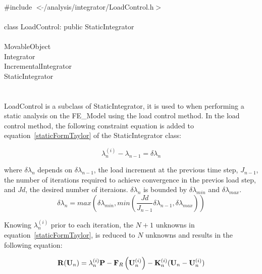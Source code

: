 
   \\
\indent \#include $<\tilde{ }$/analysis/integrator/LoadControl.h$>$  \\

  \\
\indent class LoadControl: public StaticIntegrator  \\

 \\
\indent MovableObject \\
\indent\indent Integrator \\
\indent\indent\indent IncrementalIntegrator \\
\indent\indent\indent\indent StaticIntegrator \\
\indent\indent\indent\indent{} \\

 \\ 
\indent LoadControl is a subclass of StaticIntegrator, it is
used to when performing a static analysis on the FE\_Model using the
load control method. In the load control method, the following
constraint equation is added to equation~\ref{staticFormTaylor} of the
StaticIntegrator class: 

\[ 
\lambda_n^{(i)} - \lambda_{n-1} = \delta \lambda_n
\]

\noindent where $\delta \lambda_n$ depends on $\delta \lambda_{n-1}$,
the load increment at the previous time step, $J_{n-1}$,
the number of iterations required to achieve convergence in the
previos load step, and $Jd$, the desired number of iteraions. $\delta
\lambda_n$ is bounded by $\delta \lambda_{min}$  and $\delta \lambda_{max}$. \\


\[ 
\delta \lambda_n = max \left( \delta \lambda_{min}, min \left(
\frac{Jd}{J_{n-1}} \delta \lambda_{n-1}, \delta \lambda_{max} \right) \right)
\]

Knowing $\lambda_n^{(i)}$ prior to each iteration, the $N+1$ unknowns
in equation~\ref{staticFormTaylor}, is reduced to $N$ unknowns and
results in the following equation:

\begin{equation} 
{\bf R}({\bf U}_{n}) = \lambda_n^{(i)} {\bf P} 
 - {\bf F}_{R}\left({\bf U}_{n}^{(i)} \right) - 
{\bf K}_n^{(i)} 
({\bf U}_{n} - {\bf U}_{n}^{(i)})  
\label{staticFormLoadControl}
\end{equation} 

